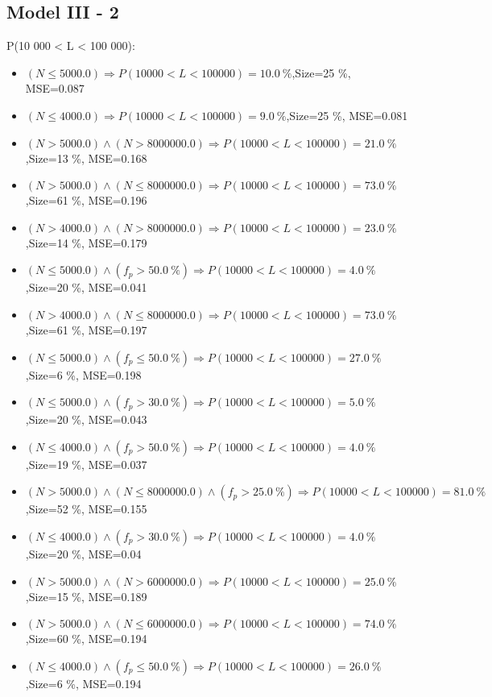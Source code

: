 \documentclass[numbered]{CSL}
\begin{document}
\subsection{Model III - 2}
P(10 000 < L < 100 000):
\begin{itemize}
\item $(N \leq 5000.0) \Rightarrow P(10 000 < L < 100 000) = 10.0~\%$,\hfill Size=25 \%, MSE=0.087
\item $(N \leq 4000.0) \Rightarrow P(10 000 < L < 100 000) = 9.0~\%$,\hfill Size=25 \%, MSE=0.081
\item $(N > 5000.0) \land (N > 8000000.0) \Rightarrow P(10 000 < L < 100 000) = 21.0~\%$,\hfill Size=13 \%, MSE=0.168
\item $(N > 5000.0) \land (N \leq 8000000.0) \Rightarrow P(10 000 < L < 100 000) = 73.0~\%$,\hfill Size=61 \%, MSE=0.196
\item $(N > 4000.0) \land (N > 8000000.0) \Rightarrow P(10 000 < L < 100 000) = 23.0~\%$,\hfill Size=14 \%, MSE=0.179
\item $(N \leq 5000.0) \land (f_p > 50.0~\%) \Rightarrow P(10 000 < L < 100 000) = 4.0~\%$,\hfill Size=20 \%, MSE=0.041
\item $(N > 4000.0) \land (N \leq 8000000.0) \Rightarrow P(10 000 < L < 100 000) = 73.0~\%$,\hfill Size=61 \%, MSE=0.197
\item $(N \leq 5000.0) \land (f_p \leq 50.0~\%) \Rightarrow P(10 000 < L < 100 000) = 27.0~\%$,\hfill Size=6 \%, MSE=0.198
\item $(N \leq 5000.0) \land (f_p > 30.0~\%) \Rightarrow P(10 000 < L < 100 000) = 5.0~\%$,\hfill Size=20 \%, MSE=0.043
\item $(N \leq 4000.0) \land (f_p > 50.0~\%) \Rightarrow P(10 000 < L < 100 000) = 4.0~\%$,\hfill Size=19 \%, MSE=0.037
\item $(N > 5000.0) \land (N \leq 8000000.0) \land (f_p > 25.0~\%) \Rightarrow P(10 000 < L < 100 000) = 81.0~\%$,\hfill Size=52 \%, MSE=0.155
\item $(N \leq 4000.0) \land (f_p > 30.0~\%) \Rightarrow P(10 000 < L < 100 000) = 4.0~\%$,\hfill Size=20 \%, MSE=0.04
\item $(N > 5000.0) \land (N > 6000000.0) \Rightarrow P(10 000 < L < 100 000) = 25.0~\%$,\hfill Size=15 \%, MSE=0.189
\item $(N > 5000.0) \land (N \leq 6000000.0) \Rightarrow P(10 000 < L < 100 000) = 74.0~\%$,\hfill Size=60 \%, MSE=0.194
\item $(N \leq 4000.0) \land (f_p \leq 50.0~\%) \Rightarrow P(10 000 < L < 100 000) = 26.0~\%$,\hfill Size=6 \%, MSE=0.194

\end{itemize}
\end{document}

